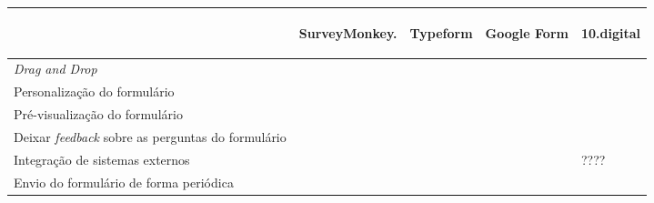 \newpage
		

		\renewcommand{\arraystretch}{2.5}
		\setlength\arrayrulewidth{1.5pt}
	\begin{table}[!ht]  
		\begin{center}
		\begin{tabular}{|p{4cm}|p{1.5cm}|p{1.5cm}|p{1.5cm}|p{1.5cm}|}
			\cline{2-5}
			\multicolumn{1}{c|}{} & \hspace{0.6cm}\begin{sideways}SurveyMonkey.\end{sideways} & \hspace{0.6cm}\begin{sideways}Typeform\end{sideways} & \hspace{0.6cm}\begin{sideways}Google Form\end{sideways} &\hspace{0.6cm}\begin{sideways} 10.digital\end{sideways}\\ \hline
			
		
				\textit{Drag and Drop} & \cellcolor{green!80}   & \cellcolor{red!80}  & \cellcolor{red!80} & \cellcolor{red!80} \\ \hline
				
			Personalização do formulário& \cellcolor{green!80}    & \cellcolor{green!80}   & \cellcolor{yellow!80} & \cellcolor{green!80}   \\ \hline
			
			 Pré-visualização do formulário& \cellcolor{green!80}  & \cellcolor{green!80}  & \cellcolor{green!80} & \cellcolor{green!80} \\ \hline
			 
			 	Deixar \textit{feedback} sobre as perguntas do formulário& \cellcolor{red!80}    & \cellcolor{red!80}   & \cellcolor{red!80} & \cellcolor{green!80}   \\ \hline
			
			 Integração de sistemas externos& \cellcolor{red!80}   & \cellcolor{green!80} & \cellcolor{yellow!80}  & ????  \\ \hline
			
			Envio do formulário de forma periódica & \cellcolor{red!80}   & \cellcolor{red!80}  & \cellcolor{red!80} & \cellcolor{green!80} \\ \hline
			

\end{tabular}
\end{center}
\end{table}
